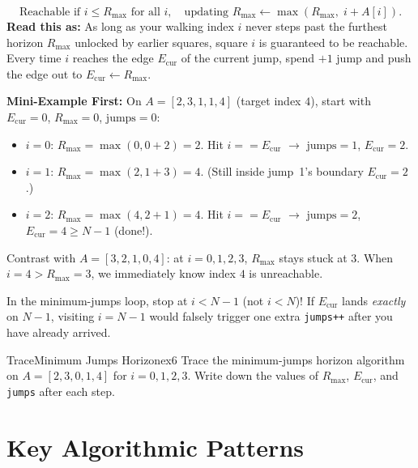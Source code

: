 \documentclass[11pt,a4paper]{article}
\theoremstyle{definition}
\newcommand{\examplebeat}{\textbf{\color{primaryblue}Mini-Example First:} }
\begin{document}
\begin{formulabox}
$$\text{Reachable if } i \le R_{\max} \text{ for all } i, \quad \text{updating } R_{\max} \leftarrow \max(R_{\max},\; i + A[i]).$$
\textbf{Read this as:} As long as your walking index $i$ never steps past the furthest horizon $R_{\max}$ unlocked by earlier squares, square $i$ is guaranteed to be reachable. Every time $i$ reaches the edge $E_{\text{cur}}$ of the current jump, spend $+1$ jump and push the edge out to $E_{\text{cur}} \leftarrow R_{\max}$.
\end{formulabox}

\examplebeat On $A = [2, 3, 1, 1, 4]$ (target index $4$), start with $E_{\text{cur}} = 0$, $R_{\max} = 0$, $\text{jumps} = 0$:
\begin{itemize}[itemsep=2pt, topsep=2pt]
    \item $i = 0$: $R_{\max} = \max(0, 0{+}2) = 2$. Hit $i == E_{\text{cur}}$ $\to$ $\text{jumps} = 1$, $E_{\text{cur}} = 2$.
    \item $i = 1$: $R_{\max} = \max(2, 1{+}3) = 4$. (Still inside jump~1's boundary $E_{\text{cur}} = 2$.)
    \item $i = 2$: $R_{\max} = \max(4, 2{+}1) = 4$. Hit $i == E_{\text{cur}}$ $\to$ $\text{jumps} = 2$, $E_{\text{cur}} = 4 \ge N{-}1$ (done!).
\end{itemize}
Contrast with $A = [3, 2, 1, 0, 4]$: at $i = 0, 1, 2, 3$, $R_{\max}$ stays stuck at $3$. When $i = 4 > R_{\max} = 3$, we immediately know index $4$ is unreachable.

\begin{watchoutbox}
In the minimum-jumps loop, stop at $i < N - 1$ (not $i < N$)! If $E_{\text{cur}}$ lands \emph{exactly} on $N - 1$, visiting $i = N - 1$ would falsely trigger one extra \texttt{jumps++} after you have already arrived.
\end{watchoutbox}

\begin{tryitbox}{Trace}{Minimum Jumps Horizon}{ex6}
Trace the minimum-jumps horizon algorithm on $A = [2, 3, 0, 1, 4]$ for $i = 0, 1, 2, 3$. Write down the values of $R_{\max}$, $E_{\text{cur}}$, and \texttt{jumps} after each step.
\end{tryitbox}

\section{Key Algorithmic Patterns}
\end{document}
